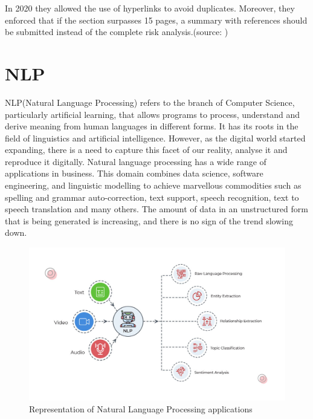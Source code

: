 \documentclass[12pt,MSc,a4paper,oneside]{muthesis}
\begin{document}
In 2020 they allowed the use of hyperlinks to avoid duplicates. Moreover, they enforced that if the section surpasses 15 pages, a summary with references should be submitted instead of the complete risk analysis.(source: \cite{modernisation-ruling})

\section{NLP}
NLP(Natural Language Processing) refers to the branch of Computer Science, particularly artificial learning, that allows programs to process, understand and derive meaning from human languages in different forms. It has its roots in the field of linguistics and artificial intelligence. However, as the digital world started expanding, there is a need to capture this facet of our reality, analyse it and reproduce it digitally. Natural language processing has a wide range of applications in business. This domain combines data science, software engineering, and linguistic modelling to achieve marvellous commodities such as spelling and grammar auto-correction, text support, speech recognition, text to speech translation and many others. The amount of data in an unstructured form that is being generated is increasing, and there is no sign of the trend slowing down.

\begin{figure}[h]
    \centering
    \includegraphics[scale=0.5]{images/abstract/NLP_Processing.jpg}
    \caption{Representation of Natural Language Processing applications}
\end{figure}
\end{document}
